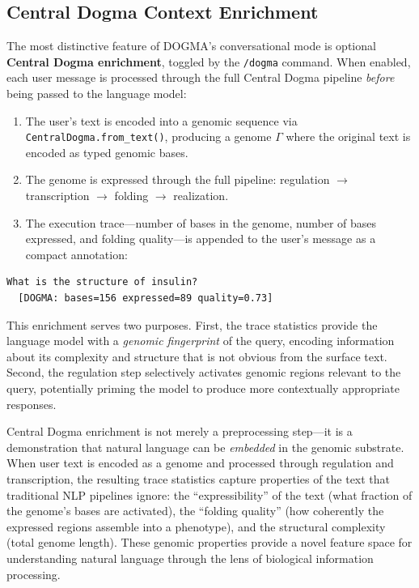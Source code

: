 \subsection{Central Dogma Context Enrichment}
\label{sec:dogma-enrich}

The most distinctive feature of DOGMA's conversational mode is optional \textbf{Central Dogma enrichment}, toggled by the \texttt{/dogma} command. When enabled, each user message is processed through the full Central Dogma pipeline \emph{before} being passed to the language model:

\begin{enumerate}[leftmargin=1.8em]
  \item The user's text is encoded into a genomic sequence via \texttt{CentralDogma.from\_text()}, producing a genome $\Gamma$ where the original text is encoded as typed genomic bases.
  \item The genome is expressed through the full pipeline: regulation $\to$ transcription $\to$ folding $\to$ realization.
  \item The execution trace---number of bases in the genome, number of bases expressed, and folding quality---is appended to the user's message as a compact annotation:
\end{enumerate}

\begin{verbatim}
What is the structure of insulin?
  [DOGMA: bases=156 expressed=89 quality=0.73]
\end{verbatim}

This enrichment serves two purposes. First, the trace statistics provide the language model with a \emph{genomic fingerprint} of the query, encoding information about its complexity and structure that is not obvious from the surface text. Second, the regulation step selectively activates genomic regions relevant to the query, potentially priming the model to produce more contextually appropriate responses.

\begin{keyinsight}
Central Dogma enrichment is not merely a preprocessing step---it is a demonstration that natural language can be \emph{embedded} in the genomic substrate. When user text is encoded as a genome and processed through regulation and transcription, the resulting trace statistics capture properties of the text that traditional NLP pipelines ignore: the ``expressibility'' of the text (what fraction of the genome's bases are activated), the ``folding quality'' (how coherently the expressed regions assemble into a phenotype), and the structural complexity (total genome length). These genomic properties provide a novel feature space for understanding natural language through the lens of biological information processing.
\end{keyinsight}

